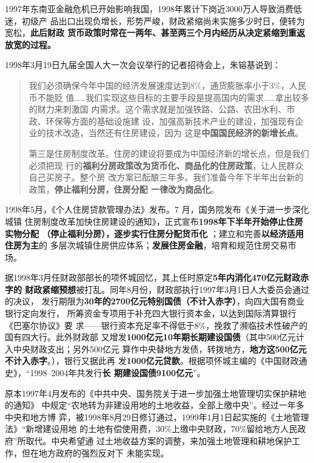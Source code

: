 1997年东南亚金融危机已开始影响我国，1998年累计下岗近3000万人导致消费低迷，初级产
品出口出现负增长，形势严峻，财政紧缩尚未实施多少时日，便转为宽松，\textbf{此后财政
  货币政策时常在一两年、甚至两三个月内经历从决定紧缩到重返放宽的过程。}


1998年3月19日九届全国人大一次会议举行的记者招待会上，朱镕基说到：
\begin{quotation}
  我们必须确保今年中国的经济发展速度达到8\%，通货膨胀率小于3\%，人民币不能贬
  值……我们实现这些目标的主要手段是提高国内的需求……拿出较多的财力来刺激国
  内需求。这个需求就是加强铁路、公路、农田水利、市政、环保等方面的基础设施建
  设，加强高新技术产业的建设，加强现有企业的技术改造，当然还有住房建设，因为
  这是\textbf{中国国民经济的新增长点}。


  第三是住房制度改革。住房的建设将要成为中国经济新的增长点，但是我们必须把现
  行的\textbf{福利分房政策改为货币化、商品化的住房政策}，让人民群众自己买房子。整个房
  改方案已酝酿三年多。我们准备今年下半年出台新的政策，\textbf{停止福利分房，住房分配
  一律改为商品化}。
\end{quotation}

1998年5月，《个人住房贷款管理办法》发布。7 月，国务院发布《关于进一步深化城镇
住房制度改革加快住房建设的通知》，正式宣布\textbf{1998年下半年开始停止住房实物分配
  （停止福利分房），逐步实行住房分配货币化} ；建立和完善\textbf{以经济适用住房为主}的
多层次城镇住房供应体系；\textbf{发展住房金融}，培育和规范住房交易市场。

据1998年3月任财政部部长的项怀城回忆，其上任时原定\textbf{5年内消化470亿元财政赤字的
  财政紧缩预想}被打乱。同年8月份，财政部执行1997年3月1日人大委员会通过的决议，
发行期限为\textbf{30年的2700亿元特别国债（不计入赤字）}，向四大国有商业银行定向发行，
所筹资金专项用于补充四大银行资本金，以达到国际清算银行《巴塞尔协议》要
求——银行资本充足率不得低于8\%，挽救了濒临技术性破产的国有四大行。此外财政部
又增发\textbf{1000亿元10年期长期建设国债}（其中500亿元计入中央财政支出；另外500亿元
算作中央替地方发债，转拨地方，\textbf{地方这500亿元不计入赤字}。），银行又据此再
发\textbf{1000亿元贷款}。根据项怀城主编的《中国财政通史》，“1998--2004年共发行\textbf{长
  期建设国债9100亿元}”。


原本1997年4月发布的《中共中央、国务院关于进一步加强土地管理切实保护耕地的通知》
中规定“农地转为非建设用地的土地收益，全部上缴中央”。经过一年多中央和地方博
弈，被1998年8月29日修订通过，1999年1月1日起实施的《土地管理法》“新增建设用地
的土地有偿使用费，30\%上缴中央财政，70\%留给地方人民政府”所取代。中央希望通
过土地收益方案的调整，来加强土地管理和耕地保护工作，但在地方政府的强烈反对下
未能实现。\cite{ZDJJ200804009}

